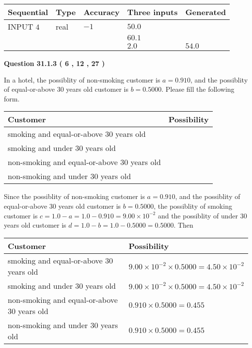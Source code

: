 \documentclass[12pt]{article}
\begin{document}
   
  
  
\noindent\begin{tabular}{|l|l|l|l|l|}
\hline
 Sequential & Type & Accuracy & Three inputs & Generated \\ 
\hline
 
 
  INPUT $            4 $ & real & $           -1  $ & $
 50.0
  $ & \\
  & & &  $
 60.1
  $ & \\
  & & &  $
 2.0
 $ & $ 54.0 $ 
 \\  \hline  
 \end{tabular}
   
   
  
\vspace{0.2in}
  
{\textbf{\Large{Question
31.1.3 
 (           6 ,          12 ,          27 )
}}}
  
  
In a hotel, the possiblity of  %
non-smoking customer is
$a =  %
0.910$, and the possiblity of  %
equal-or-above 30 years old customer is $ b =  %
0.5000$.
Please fill the following form.
 
\noindent
\begin{tabular}{|l|l|}
\hline
Customer & Possibility \\
\hline
smoking  and   %
equal-or-above 30 years old  & \\
\hline
smoking  and   %
under 30 years old & \\
\hline
 non-smoking and   %
equal-or-above 30 years old  & \\
\hline
 non-smoking and  %
under 30 years old & \\
\hline
\end{tabular}
 
 
 
 
 
\noindent{}
 
 

Since the possiblity of  %
 non-smoking customer is $ a =  %
0.910 $,
and the possiblity of  %
equal-or-above 30 years old customer is $ b =  %
0.5000 $,
the possiblity of  %
smoking customer is $ c = 1.0 - a = 1.0 -
0.910
=  %
9.00 \times 10^{-2} $ and the possiblity of  %
under 30 years old
customer is $ d = 1.0 - b = 1.0 -  %
0.5000 =  %
0.5000  $.
Then
 
\noindent
\begin{tabular}{|l|l|}
\hline
Customer & Possibility \\
\hline
smoking  and  %
equal-or-above 30 years old  &
  $ %
9.00 \times 10^{-2} \times  %
0.5000 =  %
4.50 \times 10^{-2}$ \\
\hline
smoking  and  %
under 30 years old &
  $ %
9.00 \times 10^{-2} \times  %
0.5000 =  %
4.50 \times 10^{-2}$ \\
\hline
 non-smoking and  %
equal-or-above 30 years old  &
  $ %
0.910 \times  %
0.5000 =  %
0.455$ \\
\hline
 non-smoking and  %
under 30 years old &
  $ %
0.910 \times  %
0.5000 =  %
0.455$ \\
\hline
\end{tabular}
 
\end{document}
